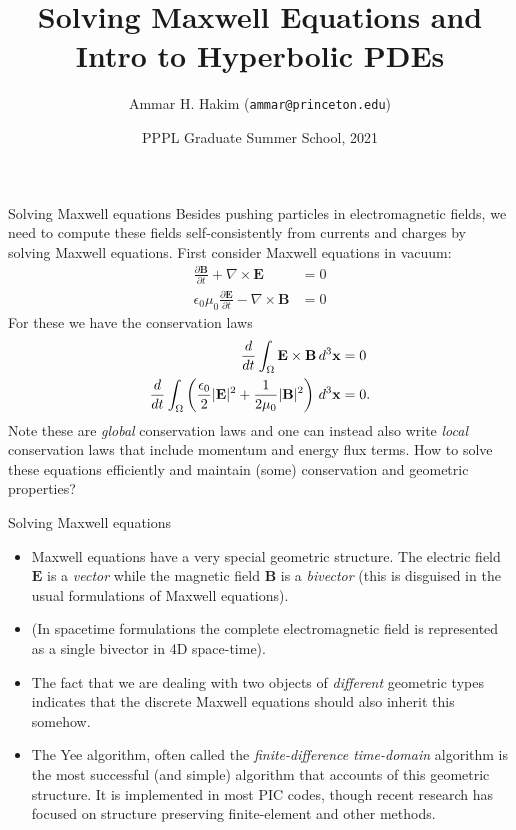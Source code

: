 \documentclass[aspectratio=169]{beamer}
\title[{\tt }]{Solving Maxwell Equations and Intro to Hyperbolic PDEs}%
\author[http://cmpp.rtfd.io]%
{Ammar H. Hakim ({\tt ammar@princeton.edu}) \inst{1}}%
\institute[PPPL]
{ \inst{1} Princeton Plasma Physics Laboratory, Princeton, NJ %
}
\date[8/18/2021]{PPPL Graduate Summer School, 2021}
\newcommand{\mvec}[1]{\mathbf{#1}}
\newcommand{\dtx}{\thinspace d^3\mvec{x}}
\theoremstyle{definition}
\begin{document}
\begin{frame}[plain]
  \titlepage
\end{frame}

\begin{frame}{Solving Maxwell equations}
  \small%
  Besides pushing particles in electromagnetic fields, we need to
  compute these fields self-consistently from currents and charges by
  solving Maxwell equations. First consider Maxwell equations in
  vacuum:
  \begin{align*}
    \frac{\partial \mvec{B}}{\partial t} + \nabla\times\mvec{E} &= 0 \\
    \epsilon_0\mu_0\frac{\partial \mvec{E}}{\partial t} -
    \nabla\times\mvec{B} &= 0
  \end{align*}
  For these we have the conservation laws
  \begin{align*}
    \frac{d}{dt} \int_\Omega \mvec{E}\times\mvec{B}  \dtx &= 0 \\
    \frac{d}{dt} \int_\Omega \left( \frac{\epsilon_0}{2} |\mvec{E}|^2 + \frac{1}{2\mu_0} |\mvec{B}|^2 \right) \dtx &= 0.
  \end{align*}
  Note these are \emph{global} conservation laws and one can instead
  also write \emph{local} conservation laws that include momentum and
  energy flux terms. How to solve these equations efficiently and
  maintain (some) conservation and geometric properties?
\end{frame}

\begin{frame}{Solving Maxwell equations}
  \begin{itemize}
  \item Maxwell equations have a very special geometric structure. The
    electric field $\mvec{E}$ is a \emph{vector} while the magnetic
    field $\mvec{B}$ is a \emph{bivector} (this is disguised in the
    usual formulations of Maxwell equations).
  \item (In spacetime formulations the complete electromagnetic field
    is represented as a single bivector in 4D space-time).
  \item The fact that we are dealing with two objects of
    \emph{different} geometric types indicates that the discrete
    Maxwell equations should also inherit this somehow.
  \item The Yee algorithm, often called the \emph{finite-difference
      time-domain} algorithm is the most successful (and simple)
    algorithm that accounts of this geometric structure. It is
    implemented in most PIC codes, though recent research has focused
    on structure preserving finite-element and other methods.
  \end{itemize}
\end{frame}
\end{document}
